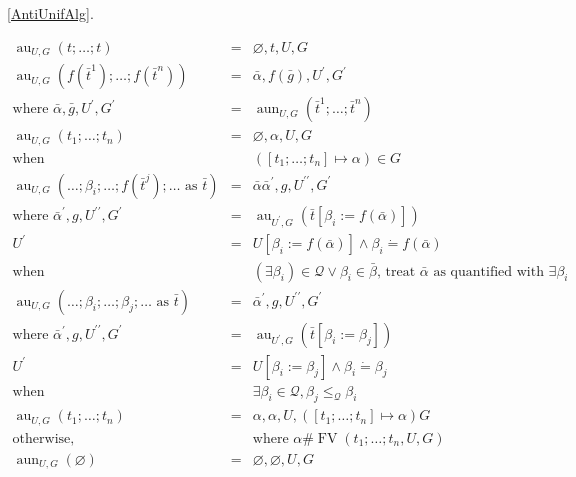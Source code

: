 \documentclass{article}
\newcommand{\assign}{:=}
\newcommand{\tmop}[1]{\ensuremath{\operatorname{#1}}}
\begin{document}
\ref{AntiUnifAlg}.\begin{table}[t]
  \begin{eqnarray*}
    \tmop{au}_{U, G} (t ; \ldots ; t) & = & \varnothing, t, U, G\\
    \tmop{au}_{U, G} (f (\bar{t}^1) ; \ldots ; f (\bar{t}^n)) & = &
    \bar{\alpha}, f (\bar{g}), U^{\prime}, G^{\prime}\\
    \text{where \ } \bar{\alpha}, \bar{g}, U^{\prime}, G^{\prime} & = &
    \tmop{aun}_{U, G} (\bar{t}^1 ; \ldots ; \bar{t}^n)\\
    \tmop{au}_{U, G} (t_1 ; \ldots ; t_n) & = & \varnothing, \alpha, U, G\\
    \text{when} &  & ([t_1 ; \ldots ; t_n] \mapsto \alpha) \in G\\
    \tmop{au}_{U, G} (\ldots ; \beta_i ; \ldots ; f (\bar{t}^j) ; \ldots
    \text{ as } \bar{t}) & = & \bar{\alpha} \bar{\alpha}^{\prime}, g,
    U^{\prime\prime}, G^{\prime}\\
    \text{where \ } \bar{\alpha}^{\prime}, g, U^{\prime\prime}, G^{\prime} & =
    & \tmop{au}_{U^{\prime}, G} (\bar{t} [\beta_i \assign f (\bar{\alpha})])\\
    U^{\prime} & = & U [\beta_i \assign f (\bar{\alpha})] \wedge \beta_i
    \dot{=} f (\bar{\alpha})\\
    \text{when} &  & (\exists \beta_i) \in \mathcal{Q} \vee \beta_i \in
    \bar{\beta} \text{, treat } \bar{\alpha} \text{ as quantified with }
    \exists \beta_i\\
    \tmop{au}_{U, G} (\ldots ; \beta_i ; \ldots ; \beta_j ; \ldots \text{ as }
    \bar{t}) & = & \bar{\alpha}^{\prime}, g, U^{\prime\prime}, G^{\prime}\\
    \text{where \ } \bar{\alpha}^{\prime}, g, U^{\prime\prime}, G^{\prime} & =
    & \tmop{au}_{U^{\prime}, G} (\bar{t} [\beta_i \assign \beta_j])\\
    U^{\prime} & = & U [\beta_i \assign \beta_j] \wedge \beta_i \dot{=}
    \beta_j\\
    \text{when} &  & \exists \beta_i \in \mathcal{Q}, \beta_j
    \leqslant_{\mathcal{Q}} \beta_i\\
    \tmop{au}_{U, G} (t_1 ; \ldots ; t_n) & = & \alpha, \alpha, U, ([t_1 ;
    \ldots ; t_n] \mapsto \alpha) G\\
    \text{otherwise,} &  & \text{where } \alpha \# \tmop{FV} (t_1 ; \ldots ;
    t_n, U, G)\\
    \tmop{aun}_{U, G} (\varnothing) & = & \varnothing, \varnothing, U, G\\

\end{eqnarray*}
\end{table}
\end{document}
